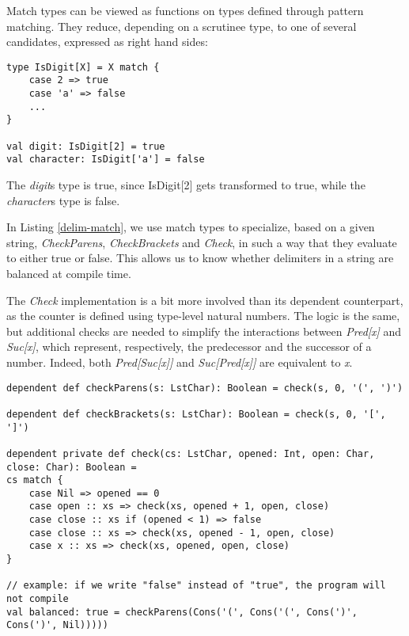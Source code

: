 Match types can be viewed as functions on types defined through pattern matching. They reduce, depending on a scrutinee type, to one of several candidates, expressed as right hand sides:

\begin{lstlisting}[style=myScalastyle]
type IsDigit[X] = X match {
    case 2 => true
    case 'a' => false
    ...
}

val digit: IsDigit[2] = true
val character: IsDigit['a'] = false
\end{lstlisting}

The \textit{digit}\textquotesingle s type is true, since IsDigit[2] gets transformed to true, while the \textit{character}\textquotesingle s type is false.

In Listing \ref{delim-match}, we use match types to specialize, based on a given string, \textit{CheckParens}, \textit{CheckBrackets} and \textit{Check}, in such a way that they evaluate to either true or false. This allows us to know whether delimiters in a string are balanced at compile time.

The \textit{Check} implementation is a bit more involved than its dependent counterpart, as the counter is defined using type-level natural numbers. The logic is the same, but additional checks are needed to simplify the interactions between \textit{Pred[x]} and \textit{Suc[x]}, which represent, respectively, the predecessor and the successor of a number. Indeed, both \textit{Pred[Suc[x]]} and \textit{Suc[Pred[x]]} are equivalent to \textit{x}.
 
\onecolumn 
 
\begin{lstlisting}[style=myScalastyle, caption={Dependent types implementation of a delimiter balance checker.}, captionpos=b, label={delim-dependent}]
dependent def checkParens(s: LstChar): Boolean = check(s, 0, '(', ')')

dependent def checkBrackets(s: LstChar): Boolean = check(s, 0, '[', ']')

dependent private def check(cs: LstChar, opened: Int, open: Char, close: Char): Boolean = 
cs match {
    case Nil => opened == 0
    case open :: xs => check(xs, opened + 1, open, close)
    case close :: xs if (opened < 1) => false
    case close :: xs => check(xs, opened - 1, open, close)
    case x :: xs => check(xs, opened, open, close)
}

// example: if we write "false" instead of "true", the program will not compile
val balanced: true = checkParens(Cons('(', Cons('(', Cons(')', Cons(')', Nil)))))
\end{lstlisting} 
 
